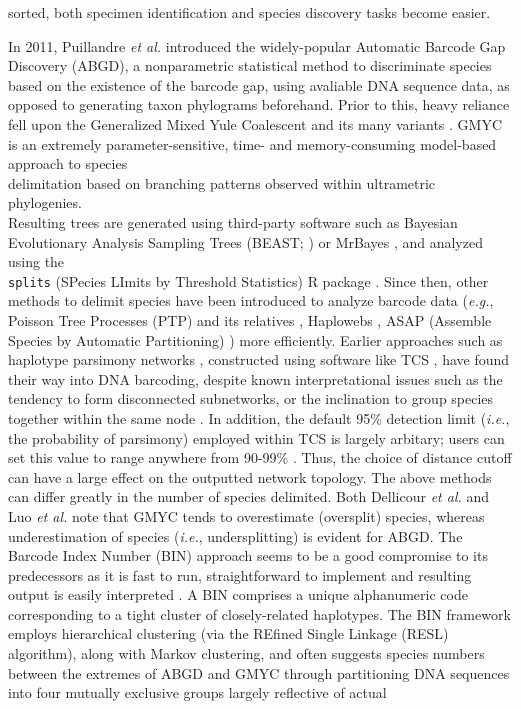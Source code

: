sorted, both specimen identification and species discovery tasks become easier. 


  
In 2011, Puillandre \textit{et al.} \cite{puillandre2011abgd} introduced the widely-popular Automatic Barcode Gap Discovery (ABGD), a nonparametric statistical method to discriminate species based on the existence of the barcode gap, using avaliable DNA sequence data, as opposed to generating taxon phylograms beforehand. Prior to this, heavy reliance fell upon the Generalized Mixed Yule Coalescent and its many variants \cite{fujisawa2013delimiting, monaghan2009accelerated, pons2006sequence, reid2012phylogenetic}. GMYC is an extremely parameter-sensitive, time- and memory-consuming model-based approach to species \\ delimitation based on branching patterns observed within ultrametric phylogenies. \\ Resulting trees are generated using third-party software such as Bayesian Evolutionary Analysis Sampling Trees (BEAST; \cite{drummond2007beast}) or MrBayes \cite{huelsenbeck2001mrbayes}, and analyzed using the \\ {\tt splits} (SPecies LImits by Threshold Statistics) R package \cite{ezard2017splits}. Since then, other methods to delimit species have been introduced to analyze barcode data (\textit{e.g.}, Poisson Tree Processes (PTP) and its relatives \cite{kapli2017multirate, zhang2013general}, Haplowebs \cite{dellicour2015delimiting}, ASAP (Assemble Species by Automatic Partitioning) \cite{puillandre2021asap}) more efficiently. Earlier approaches such as haplotype parsimony networks \cite{templeton1992cladistic}, constructed using software like TCS \cite{clement2000tcs}, have found their way into DNA barcoding, despite known interpretational issues such as the tendency to form disconnected subnetworks, or the inclination to group species together within the same node \cite{hart2007things, phillips2019incomplete}. In addition, the default 95\% detection limit (\textit{i.e.}, the probability of parsimony) employed within TCS is largely arbitary; users can set this value to range anywhere from 90-99\% \cite{clement2000tcs}. Thus, the choice of distance cutoff can have a large effect on the outputted network topology. The above methods can differ greatly in the number of species delimited. Both Dellicour \textit{et al.} \cite{dellicour2018hitchhiker} and Luo \textit{et al.} \cite{luo2018comparison} note that GMYC tends to overestimate (oversplit) species, whereas underestimation of species (\textit{i.e.}, undersplitting) is evident for ABGD. The Barcode Index Number (BIN) approach \cite{ratnasingham2013dna} seems to be a good compromise to its predecessors as it is fast to run, straightforward to implement and resulting output is easily interpreted \cite{kekkonen2014dna}. A BIN comprises a unique alphanumeric code corresponding to a tight cluster of closely-related haplotypes. The BIN framework employs hierarchical clustering (via the REfined Single Linkage (RESL) algorithm), along with Markov clustering, and often suggests species numbers between the extremes of ABGD and GMYC through partitioning DNA sequences into four mutually exclusive groups largely reflective of actual 